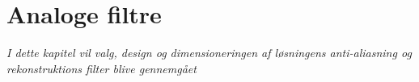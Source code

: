 \chapter{Analoge filtre}\label{kap:filtre}
\vspace*{0.5 cm}
\emph{I dette kapitel vil valg, design og dimensioneringen af løsningens anti-aliasning og rekonstruktions filter blive gennemgået}
